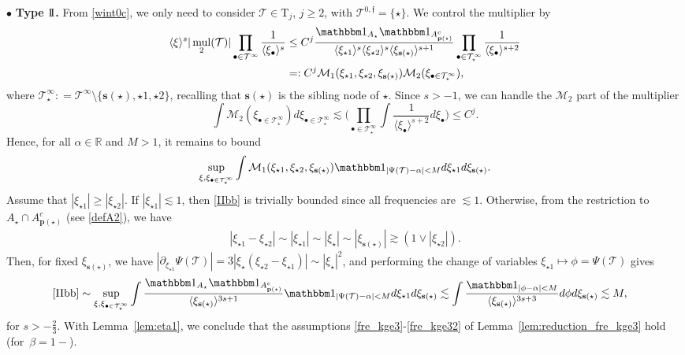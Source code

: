 \documentclass[a4paper,
11pt,  reqno]{amsart}
\newcommand{\II}{\textup{I \hspace{-2.9mm} I} }
\newcommand{\5}{\textup{V}}
\newcommand{\noi}{\noindent}
\newcommand{\ind}{\mathbbm 1}
\newcommand{\les}{\lesssim}
\theoremstyle{remark}
\newcommand{\R}{\mathbb{R}}
\newcommand{\bul}{\bullet}
\newcommand{\TT}{\mathcal{T}}
\newcommand{\Tr}{\mathrm{T}}
\newcommand{\al}{\alpha}
\newcommand{\be}{\beta}
\newcommand{\pb}{\mathbf{p}}
\newcommand{\sbf}{\mathbf{s}}
\newcommand{\ges}{\gtrsim}
\newcommand{\jb}[1]
{\langle #1 \rangle}
\newcommand{\ff}{\mathfrak{f}}
\newcommand{\M}{\mathcal{M}}
\DeclareMathOperator{\mul}{mul}
\numberwithin{equation}{section}
\numberwithin{theorem}{section}
\begin{document}
\medskip
\noi
$\bul$ \textbf{Type $\II$.} From \eqref{wint0c}, we only need to consider $\TT\in \Tr_j$, $j\ge 2$, with $\TT^{0,\ff}=\{\star\}$. We control the multiplier by
\begin{align}\label{L22}
\jb{\xi}^s |\mul_2(\TT)| \prod_{\bul \in \TT^\infty} \frac{1}{\jb{\xi_\bul}^s}
&
\le
{C^j}
\frac{ \ind_{A_\star} \ind_{A^c_{\pb(\star)}} }{ \jb{\xi_{\star1}}^s \jb{\xi_{\star2}}^s  \jb{\xi_{\sbf(\star)}}^{s+1} } \prod_{\bul \in \TT^{\infty}_\star } \frac{1}{\jb{\xi_{\bul}}^{s+2}}
\\
&
=:
{C^j}
\mathcal{M}_1(\xi_{\star1}, \xi_{\star2}, \xi_{\sbf(\star)})\mathcal{M}_2(\xi_{\bul\in \TT^\infty_\star})
,
\end{align}
 where
 $\TT^\infty_\star : = \TT^\infty\setminus \{\sbf(\star), \star1, \star2\}$,
 {
 recalling that $\sbf(\star)$ is the sibling node of $\star$.}
Since $s>-1$, we can handle the $\M_2$ part of the multiplier
\begin{equation}\label{eq:estMlinha}
    \int \mathcal{M}_2(\xi_{\bul\in \TT^\infty_\star})  d\xi_{\bul\in\TT^\infty_\star} \lesssim \bigg(
\prod_{\bul \in \TT^\infty_\star }
\int \frac{1}{ \jb{\xi_{\bul}}^{s+2} } d\xi_{\bul} \bigg)  \le C^j.
\end{equation}
Hence, {for all $\al\in\R$ and $M>1$, }it remains to bound
\begin{align}
\label{IIbb}
\sup_{\xi, \xi_{\bul\in\TT^\infty_\star}}
\int \mathcal{M}_1(\xi_{\star1}, \xi_{\star2}, \xi_{\sbf(\star)})\ind_{|\Psi(\TT) - \al| < M} d\xi_{\star1} d\xi_{\sbf(\star)}.
\end{align}
Assume that
$|\xi_{\star1} | \ge |\xi_{\star2}|$.
If $|\xi_{\star1}| \les 1$, then  \eqref{IIbb} is trivially bounded since all frequencies are $\les 1$. Otherwise, from the restriction to $A_\star\cap A^c_{\pb(\star)}$ (see \eqref{defA2}), we have
\begin{align}
|\xi_{\star1}   - \xi_{\star2}| \sim |\xi_{\star1}| \sim |\xi_\star| \sim |\xi_{\sbf(\star)}| \ges (1\lor |\xi_{\star2}|).
\end{align}
Then, for fixed $\xi_{\sbf(\star)}$, we have $|\partial_{\xi_{\star1}} \Psi(\TT) | = 3| \xi_\star  (\xi_{\star2} - \xi_{\star1})| \sim |\xi_{\star}|^2$,
and performing the change of variables $\xi_{\star1} \mapsto \phi = \Psi(\TT)$ gives
\begin{align}\label{IIb}
\begin{split}
\eqref{IIbb}
&
\sim
\sup_{\xi, \xi_{\bul\in\TT^\infty_\star}}
\int \frac{\ind_{A_\star} \ind_{A^c_{\pb(\star)}}}{ \jb{\xi_{\sbf(\star)}}^{3s+1}  } \ind_{|\Psi(\TT) - \al| < M } d\xi_{\star1} d\xi_{\sbf(\star)}
\les
\int \frac{\ind_{|\phi - \al| < M } }{ \jb{\xi_{\sbf(\star)}}^{3s+3}  } d\phi d\xi_{\sbf(\star)} \les M,
\end{split}
\end{align}
for $s>-\frac23$.
{
With Lemma~\ref{lem:eta1}, we conclude that the assumptions \eqref{fre_kge3}-\eqref{fre_kge32} of Lemma~\ref{lem:reduction_fre_kge3} hold (for~$\be=1-$).
}
\end{document}
